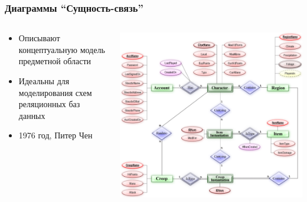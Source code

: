 \documentclass{../cscslides}
\begin{document}
    \begin{frame}
        \frametitle{Диаграммы ``Сущность-связь''}
        \begin{columns}
            \begin{column}{0.5\textwidth}
                \begin{itemize}
                    \item Описывают концептуальную модель предметной области
                    \item Идеальны для моделирования схем реляционных баз данных
                    \item 1976 год, Питер Чен
                \end{itemize}
            \end{column}
            \begin{column}{0.5\textwidth}
                \begin{center}
                    \includegraphics[width=\textwidth]{erChenNotation.png}
                \end{center}
            \end{column}
        \end{columns}
    \end{frame}
\end{document}
